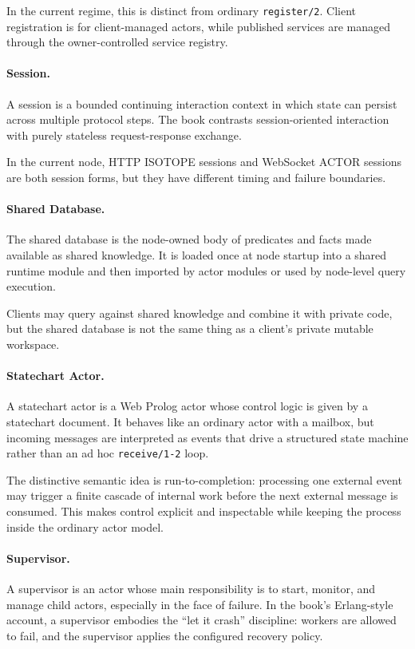 In the current regime, this is distinct from ordinary \texttt{register/2}.
Client registration is for client-managed actors, while published services are
managed through the owner-controlled service registry.

\paragraph{Session.}
A session is a bounded continuing interaction context in which state can persist
across multiple protocol steps. The book contrasts session-oriented interaction
with purely stateless request-response exchange.

In the current node, HTTP ISOTOPE sessions and WebSocket ACTOR sessions are both
session forms, but they have different timing and failure boundaries.

\paragraph{Shared Database.}
The shared database is the node-owned body of predicates and facts made
available as shared knowledge. It is loaded once at node startup into a shared
runtime module and then imported by actor modules or used by node-level query
execution.

Clients may query against shared knowledge and combine it with private code, but
the shared database is not the same thing as a client's private mutable
workspace.

\paragraph{Statechart Actor.}
A statechart actor is a Web Prolog actor whose control logic is given by a
statechart document. It behaves like an ordinary actor with a mailbox, but
incoming messages are interpreted as events that drive a structured state
machine rather than an ad hoc \texttt{receive/1-2} loop.

The distinctive semantic idea is run-to-completion: processing one external
event may trigger a finite cascade of internal work before the next external
message is consumed. This makes control explicit and inspectable while keeping
the process inside the ordinary actor model.

\paragraph{Supervisor.}
A supervisor is an actor whose main responsibility is to start, monitor, and
manage child actors, especially in the face of failure. In the book's Erlang-style
account, a supervisor embodies the ``let it crash'' discipline: workers are
allowed to fail, and the supervisor applies the configured recovery policy.

